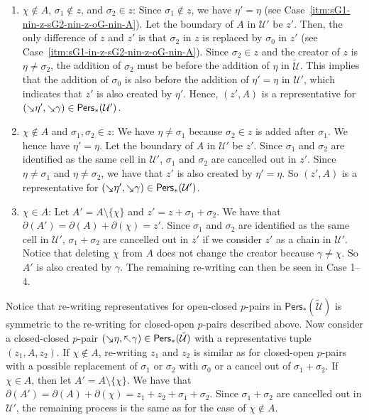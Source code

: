 \documentclass[letterpaper,11pt]{article}
\theoremstyle{mythmstyle}
\theoremstyle{mydefstyle}
\theoremstyle{plain}
\theoremstyle{definition}
\newcommand{\Pers}{\mathsf{Pers}}
\newcommand{\<}[1]{\langle #1\rangle}
\newcommand{\Set}[1]{\{#1\}}
\newcommand{\add}[1]{\mskip-2.5mu\rotatebox[origin=c]{-45}{${\rightarrow}$}{#1}}
\newcommand{\del}[1]{\mskip-2.5mu\rotatebox[origin=c]{-45}{${\leftarrow}$}{#1}}
\newcommand{\Ucal}{\mathcal{U}}
\newcommand{\sG}{\sigma}
\newcommand{\Dim}{p}
\newcommand{\extsimp}{\chi}
\begin{document}
\begin{enumerate}
    \item\label{itm:sG1-nin-z-sG2-in-z-oG-nin-A} 
    $\extsimp\not\in A$, $\sG_1\not\in z$, and $\sG_2\in z$:
    Since $\sG_1\not\in z$, we have $\eta'=\eta$ (see Case~\ref{itm:sG1-nin-z-sG2-nin-z-oG-nin-A}).
    Let the boundary of $A$ in $\Ucal'$ be $z'$.
    Then, the only difference of $z$ and $z'$ is that $\sG_2$ in $z$
    is replaced by $\sG_0$ in $z'$ (see Case~\ref{itm:sG1-in-z-sG2-nin-z-oG-nin-A}).
    Since  $\sG_2\in z$ and the creator of $z$   is $\eta\neq\sG_2$,
    the addition of $\sG_2$
    must be before the addition of $\eta$
    in $\tilde{\Ucal}$.
    This implies that
    the addition of $\sG_0$ 
    is also before the addition of $\eta'=\eta$
    in $\Ucal'$,
    which indicates that $z'$ is also created by $\eta'$.
    Hence, $(z',A)$ is a representative for 
    $(\add{\eta'},\add{\gamma})\in\Pers_*(\Ucal')$.
    
    \item $\extsimp\not\in A$ and $\sG_1,\sG_2\in z$:
    We have 
    $\eta\neq\sG_1$
    because $\sG_2\in z$ is added after $\sG_1$.
    We hence  have $\eta'=\eta$.
    Let the boundary of $A$ in $\Ucal'$ be $z'$.
    Since $\sG_1$ and $\sG_2$
    are identified as the same cell in $\Ucal'$, 
    $\sG_1$ and $\sG_2$  are cancelled out in $z'$.
    Since $\eta\neq\sG_1$ and $\eta\neq\sG_2$,
    we have that $z'$ is also created by $\eta'=\eta$.
    So $(z',A)$ is a representative for 
    $(\add{\eta'},\add{\gamma})\in\Pers_*(\Ucal')$.
    
    \item $\extsimp\in A$:
    Let $A'=A\setminus\Set{\extsimp}$
    and $z'=z+\sG_1+\sG_2$.
    We have that $\partial(A')=\partial(A)+\partial(\extsimp)=z'$.
    Since $\sG_1$ and $\sG_2$ are identified as the same cell
     in $\Ucal'$,
     $\sG_1+\sG_2$  are cancelled out in $z'$ if we consider $z'$
     as a chain in $\Ucal'$.
    Notice that deleting $\extsimp$ from $A$ does not change the creator
    because $\gamma\neq\extsimp$.
    So  $A'$ is also created by $\gamma$.
     The remaining re-writing can then be seen in Case 1--4.
    
    
    
    
    
    
\end{enumerate}

Notice that re-writing representatives for open-closed $\Dim$-pairs in 
$\Pers_*(\tilde{\Ucal})$ is symmetric to the re-writing for closed-open $\Dim$-pairs
described above.
Now consider a  closed-closed $\Dim$-pair $(\add{\eta},\del{\gamma})\in\Pers_*(\tilde{\Ucal})$
with a representative tuple $(z_1,A,z_2)$.
If $\extsimp\not\in A$, re-writing $z_1$ and $z_2$ is similar as for closed-open $\Dim$-pairs
with a possible replacement of $\sG_1$ or $\sG_2$ with $\sG_0$
or a cancel out of $\sG_1+\sG_2$.
If $\extsimp\in A$, then 
let $A'=A\setminus\Set{\extsimp}$.
We have that $\partial(A')=\partial(A)+\partial(\extsimp)=z_1+z_2+\sG_1+\sG_2$.
Since $\sG_1+\sG_2$ are cancelled out  in $\Ucal'$,
the remaining process is the same as for the case of $\extsimp\not\in A$.
\end{document}
